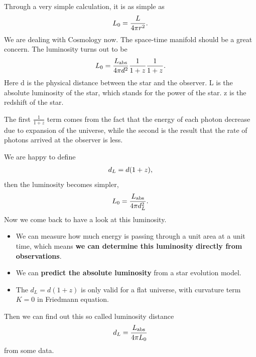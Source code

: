 \documentclass[letterpaper,10pt,english]{sphinxmanual}
\begin{document}
Through a very simple calculation, it is as simple as
\begin{gather}
\begin{split}L_0 = \frac{ L }{ 4\pi r^2 } .\end{split}\notag
\end{gather}
We are dealing with Cosmology now. The space-time manifold should be a great concern. The luminosity turns out to be
\begin{gather}
\begin{split}L_0 = \frac{L_\mathrm{abs} }{4\pi d^2} \frac{1}{1+z} \frac{1}{1+z} .\end{split}\notag
\end{gather}
Here d is the physical distance between the star and the observer. L is the absolute luminosity of the star, which stands for the power of the star. z is the redshift of the star.

The first \(\frac{1}{1+z}\) term comes from the fact that the energy of each photon decrease due to expansion of the universe, while the second is the result that the rate of photons arrived at the observer is less.

We are happy to define
\begin{gather}
\begin{split}d_L = d (1+z) ,\end{split}\notag
\end{gather}
then the luminosity becomes simpler,
\begin{gather}
\begin{split}L_0 = \frac{L_{\mathrm {abs}}}{4\pi d_L^2} .\end{split}\notag
\end{gather}
Now we come back to have a look at this luminosity.
\begin{itemize}
\item {} 
We can measure how much energy is passing through a unit area at a unit time, which means \textbf{we can determine this luminosity directly from observations}.

\item {} 
We can \textbf{predict the absolute luminosity} from a star evolution model.

\item {} 
The \(d_L = d (1+z)\) is only valid for a flat universe, with curvature term \(K=0\) in Friedmann equation.

\end{itemize}

Then we can find out this so called luminosity distance
\begin{gather}
\begin{split}d_L = \frac{  L_{\mathrm {abs}} }{ 4\pi L_0 }\end{split}\notag
\end{gather}
from some data.
\end{document}
